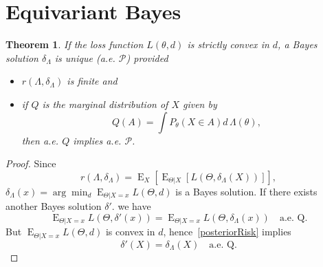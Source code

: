\documentclass{article}
\DeclareMathOperator{\myE}{E}
\theoremstyle{plain}
\newtheorem{theorem}{Theorem}
\theoremstyle{definition}
\begin{document}
\section{Equivariant Bayes}
\begin{theorem}
    If the loss function $L(\theta,d)$ is strictly convex in $d$, a Bayes solution $\delta_{\Lambda}$ is unique (a.e. $\mathcal{P}$) provided
    \begin{itemize}
        \item
            $r(\Lambda,\delta_{\Lambda})$ is finite and
        \item
            if $Q$ is the marginal distribution of $X$ given by
            \begin{equation*}
                Q(A)=\int P_{\theta}(X\in A) d\,\Lambda(\theta),
            \end{equation*}
            then a.e. $Q$ implies a.e. $\mathcal{P}$.
    \end{itemize}
\end{theorem}
\begin{proof}
    Since
    $$
    r(\Lambda,\delta_{\Lambda})=\myE_X[\myE_{\Theta|X}[L(\Theta,\delta_{\Lambda}(X))]],
    $$
    $\delta_{\Lambda}(x)=\arg\min_{d}\myE_{\Theta|X=x}L(\Theta,d)$ is a Bayes solution.
    If there exists another Bayes solution $\delta'$.
    we have
    \begin{equation}\label{posteriorRisk}
        \myE_{\Theta|X=x}L(\Theta,\delta'(x))=\myE_{\Theta|X=x}L(\Theta,\delta_{\Lambda}(x))\quad \textrm{a.e. Q.}
    \end{equation}
    But $\myE_{\Theta|X=x}L(\Theta,d)$ is convex in $d$, hence~\eqref{posteriorRisk} implies
    \begin{equation*}
        \delta'(X)=\delta_{\Lambda}(X)\quad \textrm{a.e. Q.}
    \end{equation*}
\end{proof}
\end{document}
